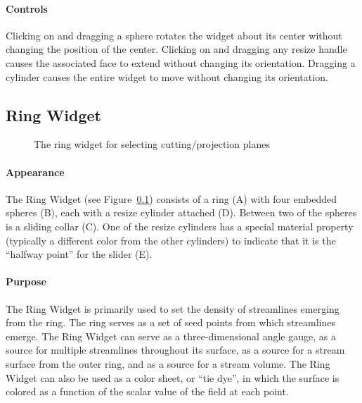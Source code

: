 \paragraph{Controls} Clicking on and dragging a sphere rotates
the widget about its center without changing the position of the center.
Clicking on and dragging any resize handle
causes the associated face to extend without changing its orientation.
Dragging a cylinder causes the entire widget to move without changing its
orientation.

\subsection{Ring Widget}
\label{sec:view-ringwidget} 

\begin{figure}[htb]
  \begin{makeimage}
  \end{makeimage}
  \ringwidget
  \caption{\label{fig:ringwidget} The ring widget for selecting
    cutting/projection planes}
\end{figure}


\paragraph{Appearance} The Ring
Widget (see Figure~\ref{sec:view-ringwidget}) consists of a ring (A)
with four embedded spheres (B), each with a resize cylinder
attached (D).  Between two of the spheres is a sliding collar (C).
One of the resize cylinders has a special material property (typically
a different color from the other cylinders) to indicate that it is the
``halfway point'' for the slider (E).

\paragraph{Purpose} The Ring Widget is primarily used to set the
density of streamlines emerging from the ring. The ring serves as a set of
seed points from which streamlines emerge. The Ring Widget can 
serve as a three-dimensional angle gauge, as a source for multiple
streamlines throughout its surface, as a source for a stream surface from
the outer ring, and as a source for a stream volume.  The Ring Widget can 
also be used as a color sheet, or ``tie dye'', in which the surface is colored as 
a function of the scalar value of the field at each point.

